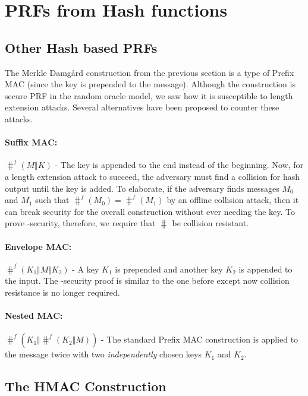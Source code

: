 \section{PRFs from Hash functions}

\subsection{Other Hash based PRFs}
The Merkle Damg{\aa}rd construction from the previous section is a type of Prefix MAC (since the key is prepended to the message). Although the construction is secure PRF in the random oracle model, we saw how it is susceptible to length extension attacks. Several alternatives have been proposed to counter these attacks. 

\paragraph{Suffix MAC:}
$\hash^f(M \Vert K)$ - The key is appended to the end instead of the beginning. Now, for a length extension attack to succeed, the adversary must find a collision for hash output until the key is added. To elaborate, if the adversary finds messages $M_0$ and $M_1$ such that $\hash^f(M_0) = \hash^f(M_1)$ by an offline collision attack, then it can break security for the overall construction without ever needing the key. To prove \PRF-security, therefore, we require that $\hash$ be collision resistant.


\paragraph{Envelope MAC:} $\hash^f(K_1 \Vert M \Vert K_2)$ - A key $K_1$ is prepended and another key $K_2$ is appended to the input. The \PRF-security proof is similar to the one before except now collision resistance is no longer required.

\paragraph{Nested MAC:}
$\hash^f(K_1 \Vert \hash^f(K_2 \Vert M))$ - The standard Prefix MAC construction is applied to the message twice with two \textit{independently} chosen keys $K_1$ and $K_2$.


\subsection{The HMAC Construction}

